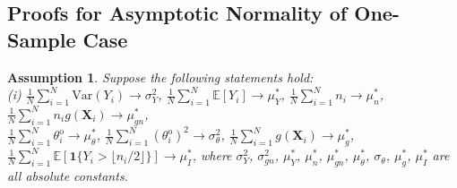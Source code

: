 \documentclass[12pt,letterpaper]{article}
\newtheorem{assumption}{Assumption}[section]
\begin{document}
\subsection{Proofs for Asymptotic Normality of One-Sample Case}\label{appendix:one-sample:asymptotis}
\begin{assumption}\label{ass:additional:one-sample}
Suppose the following statements hold:\\
\noindent (i) $\displaystyle\frac{1}{N}\sum_{i=1}^N\mathrm{Var}(Y_i)\rightarrow\sigma_Y^2$, $\displaystyle\frac{1}{N}\sum_{i=1}^N\mathbb{E}[Y_i]\rightarrow\mu_Y^*$, $\displaystyle\frac{1}{N}\sum_{i=1}^Nn_i\rightarrow\mu_n^*$, $\displaystyle\frac{1}{N}\sum_{i=1}^Nn_ig(\mathbf{X}_i)\rightarrow\mu_{gn}^*$,\\ 
$\displaystyle\frac{1}{N}\sum_{i=1}^N\theta_i^{\mathrm{o}}\rightarrow\mu_{\theta}^*$, $\displaystyle\frac{1}{N}\sum_{i=1}^N\left(\theta_i^{\mathrm{o}}\right)^2\rightarrow\sigma_{\theta}^2$, $\displaystyle\frac{1}{N}\sum_{i=1}^Ng(\mathbf{X}_i)\rightarrow\mu_g^*$, $\displaystyle\frac{1}{N}\sum_{i=1}^N\mathbb{E}\left[\mathbf{1}\{Y_i>\lfloor n_i/2\rfloor\}\right]\rightarrow\mu_I^*$, where $\sigma_Y^2$, $\sigma_{gn}^2$, $\mu_Y^*$, $\mu_n^*$, $\mu_{gn}^*$, $\mu_{\theta}^*$, $\sigma_{\theta}$, $\mu_g^*$, $\mu_I^*$ are all absolute constants.


\end{assumption}
\end{document}
